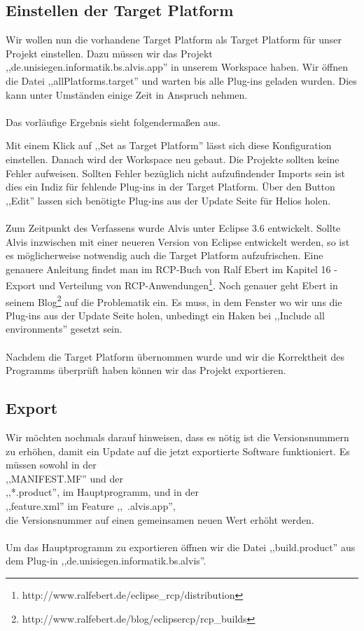 \documentclass[10pt,a4paper,oneside]{scrbook}
\begin{document}
\subsection{Einstellen der Target Platform}
Wir wollen nun die vorhandene Target Platform als Target Platform für unser Projekt einstellen. Dazu müssen wir das Projekt\\
,,de.unisiegen.informatik.bs.alvis.app'' in unserem Workspace haben. Wir öffnen die Datei ,,allPlatforms.target'' und warten bis alle Plug-ins geladen wurden. Dies kann unter Umständen einige Zeit in Anspruch nehmen. 
\\ \\
Das vorläufige Ergebnis sieht folgendermaßen aus.
\begin{center}
\end{center}

Mit einem Klick auf ,,Set as Target Platform'' lässt sich diese Konfiguration einstellen. 
Danach wird der Workspace neu gebaut. Die Projekte sollten keine Fehler aufweisen. Sollten Fehler bezüglich nicht aufzufindender Imports sein ist dies ein Indiz für fehlende Plug-ins in der Target Platform. Über den Button ,,Edit'' lassen sich benötigte Plug-ins aus der Update Seite für Helios holen.
\\ \\
Zum Zeitpunkt des Verfassens wurde Alvis unter Eclipse 3.6 entwickelt. Sollte Alvis inzwischen mit einer neueren Version von Eclipse entwickelt werden, so ist es möglicherweise notwendig auch die Target Platform aufzufrischen. Eine genauere Anleitung findet man im RCP-Buch von Ralf Ebert im Kapitel 16 - Export und Verteilung von RCP-Anwendungen\footnote{http://www.ralfebert.de/eclipse\_rcp/distribution\/}. Noch genauer geht Ebert in seinem Blog\footnote{http://www.ralfebert.de/blog/eclipsercp/rcp\_builds\/} auf die Problematik ein. Es muss, in dem Fenster wo wir uns die Plug-ins aus der Update Seite holen, unbedingt ein Haken bei ,,Include all environments'' gesetzt sein.
\\ \\

Nachdem die Target Platform übernommen wurde und wir die Korrektheit des Programms überprüft haben können wir das Projekt exportieren. 
\subsection{Export}
Wir möchten nochmals darauf hinweisen, dass es nötig ist die Versionsnummern zu erhöhen, damit ein Update auf die jetzt exportierte Software funktioniert. Es müssen sowohl in der \\
,,MANIFEST.MF'' und der \\
,,*.product'', im Hauptprogramm, und in der \\
,,feature.xml'' im Feature ,,~.alvis.app'', \\
die Versionsnummer auf einen gemeinsamen neuen Wert erhöht werden.
\\ \\
Um das Hauptprogramm zu exportieren öffnen wir die Datei ,,build.product'' aus dem Plug-in ,,de.unisiegen.informatik.bs.alvis''.
\end{document}

